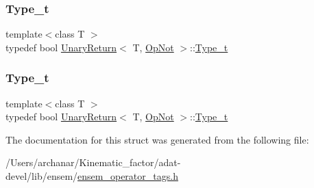 \subsubsection{\texorpdfstring{Type\_t}{Type\_t}\hspace{0.1cm}{\footnotesize\ttfamily [2/3]}}
{\footnotesize\ttfamily template$<$class T $>$ \\
typedef bool \mbox{\hyperlink{structUnaryReturn}{Unary\+Return}}$<$ T, \mbox{\hyperlink{structOpNot}{Op\+Not}} $>$\+::\mbox{\hyperlink{structUnaryReturn_3_01T_00_01OpNot_01_4_a3c2ea34de12d5f13e356568135a80bd9}{Type\+\_\+t}}}

\mbox{\label{structUnaryReturn_3_01T_00_01OpNot_01_4_a3c2ea34de12d5f13e356568135a80bd9}} 
\subsubsection{\texorpdfstring{Type\_t}{Type\_t}\hspace{0.1cm}{\footnotesize\ttfamily [3/3]}}
{\footnotesize\ttfamily template$<$class T $>$ \\
typedef bool \mbox{\hyperlink{structUnaryReturn}{Unary\+Return}}$<$ T, \mbox{\hyperlink{structOpNot}{Op\+Not}} $>$\+::\mbox{\hyperlink{structUnaryReturn_3_01T_00_01OpNot_01_4_a3c2ea34de12d5f13e356568135a80bd9}{Type\+\_\+t}}}



The documentation for this struct was generated from the following file\+:\begin{DoxyCompactItemize}
\item 
/\+Users/archanar/\+Kinematic\+\_\+factor/adat-\/devel/lib/ensem/\mbox{\hyperlink{adat-devel_2lib_2ensem_2ensem__operator__tags_8h}{ensem\+\_\+operator\+\_\+tags.\+h}}\end{DoxyCompactItemize}
